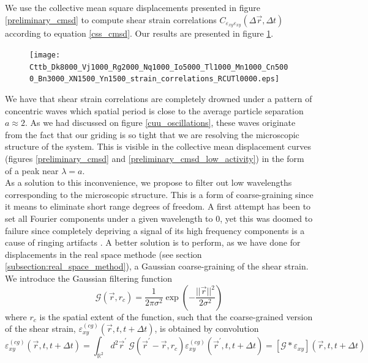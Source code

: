 \documentclass[class=report, float=false, crop=false]{standalone}
\begin{document}
\newpage
{}

We use the collective mean square displacements presented in figure \ref{preliminary_cmsd} to compute shear strain correlations $C_{\varepsilon_{xy}\varepsilon_{xy}}(\Delta \vec{r}, \Delta t)$ according to equation \ref{css_cmsd}. Our results are presented in figure \ref{non_filtered_css}.

\begin{figure}[H]
\centering
\texttt{[image: Cttb\_Dk8000\_Vj1000\_Rg2000\_Nq1000\_Io5000\_Tl1000\_Mn1000\_Cn5000\_Bn3000\_XN1500\_Yn1500\_strain\_correlations\_RCUTl0000.eps]}
\caption{}
\label{non_filtered_css}
\end{figure}

We have that shear strain correlations are completely drowned under a pattern of concentric waves which spatial period is close to the average particle separation $a \approx 2$. As we had discussed on figure \ref{cuu_oscillations}, these waves originate from the fact that our griding is so tight that we are resolving the microscopic structure of the system. This is visible in the collective mean displacement curves (figures \ref{preliminary_cmsd} and \ref{preliminary_cmsd_low_activity}) in the form of a peak near $\lambda = a$.\\

As a solution to this inconvenience, we propose to filter out low wavelengths corresponding to the microscopic structure. This is a form of coarse-graining since it means to eliminate short range degrees of freedom. A first attempt has been to set all Fourier components under a given wavelength to 0, yet this was doomed to failure since completely depriving a signal of its high frequency components is a cause of ringing artifacts \cite{ringing}. A better solution is to perform, as we have done for displacements in the real space methode (see section \ref{subsection:real_space_method}), a Gaussian coarse-graining of the shear strain.\\

We introduce the Gaussian filtering function
\begin{equation}
\mathcal{G}(\vec{r}, r_c) = \frac{1}{2\pi\sigma^2}\exp\left(-\frac{||\vec{r}||^2}{2\sigma^2}\right)
\end{equation}
where $r_c$ is the spatial extent of the function, such that the coarse-grained version of the shear strain, $\varepsilon_{xy}^{(cg)}(\vec{r}, t, t + \Delta t)$, is obtained by convolution
\begin{equation}
\varepsilon_{xy}^{(cg)}(\vec{r}, t, t + \Delta t) = \int_{\mathbb{R}^2} d^2\vec{r}^{\prime}~ \mathcal{G}(\vec{r}^{\prime} - \vec{r}, r_c) \varepsilon_{xy}^{(cg)}(\vec{r}^{\prime}, t, t + \Delta t) = \left[\mathcal{G}\ast\varepsilon_{xy}\right](\vec{r}, t, t + \Delta t)
\end{equation}
\mbox{}\\
\end{document}
